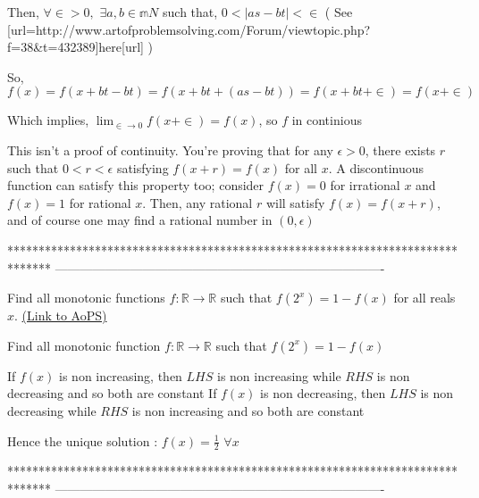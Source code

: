 \begin{solution}
	\begin{tcolorbox}
Then, $\forall \in > 0,$ $\exists a, b \in \mathbb m{N}$ such that, $0 <
\left| a s - b t \right| < \in$ ( See [url=http://www.artofproblemsolving.com/Forum/viewtopic.php?f=38&t=432389]here[\/url] )

So, $f \left( x \right) = f \left( x + b t - b t \right) = f \left( x + b t +
\left( a s - b t \right) \right) = f \left( x + b t + \in \right) = f \left( x
+ \in \right)$

Which implies, $\lim_{\in \longrightarrow 0} f \left( x + \in \right) = f
\left( x \right)$, so $f$ in continious
\end{tcolorbox}

This isn't a proof of continuity. You're proving that for any $\epsilon >0$, there exists $r$ such that $0<r< \epsilon$ satisfying $f(x+r)=f(x)$ for all $x$. A discontinuous function can satisfy this property too; consider $f(x)=0$ for irrational $x$ and $f(x)=1$ for rational $x$. Then, any rational $r$ will satisfy $f(x)=f(x+r)$, and of course one may find a rational number in $(0, \epsilon )$
\end{solution}
*******************************************************************************
-------------------------------------------------------------------------------

\begin{problem}
	Find all monotonic functions $f: \mathbb{R}\to\mathbb{R}$ such that $f(2^x)=1-f(x)$ for all reals $x$.
	\flushright \href{https://artofproblemsolving.com/community/c6h444927}{(Link to AoPS)}
\end{problem}



\begin{solution}
	\begin{tcolorbox}Find all monotonic  function $f: \mathbb{R}\to\mathbb{R}$ such that $f(2^x)=1-f(x)$\end{tcolorbox}
If $f(x)$ is non increasing, then $LHS$ is non increasing while $RHS$ is non decreasing and so both are constant
If $f(x)$ is non decreasing, then $LHS$ is non decreasing while $RHS$ is non increasing and so both are constant

Hence the unique solution : $\boxed{f(x)=\frac 12}$ $\forall x$
\end{solution}
*******************************************************************************
-------------------------------------------------------------------------------

